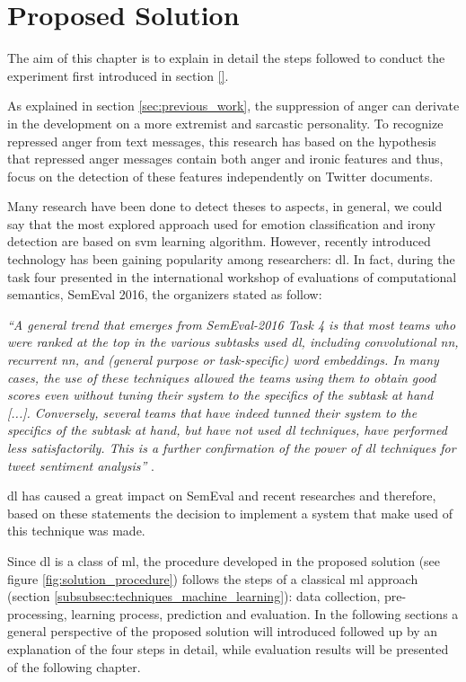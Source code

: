 \chapter{Proposed Solution}
\label{proposed_solution}

The aim of this chapter is to explain in detail the steps followed to conduct the experiment first introduced in section \ref{}.

As explained in section \ref{sec:previous_work}, the suppression of anger can derivate in the development on a more extremist and sarcastic personality. To recognize repressed anger from text messages, this research has based on the hypothesis that repressed anger messages contain both anger and ironic features and thus, focus on the detection of these features independently on Twitter documents.

Many research have been done to detect theses to aspects, in general, we could say that the most explored approach used for emotion classification and irony detection are based on \acrshort{svm} learning algorithm. However, recently introduced technology has been gaining popularity among researchers: \acrshort{dl}. In fact, during the task four presented in the international workshop of evaluations of computational semantics, SemEval 2016, the organizers stated as follow:

\textit{``A general trend that emerges from SemEval-2016 Task 4 is that most teams who were ranked at the top in the various subtasks used \acrlong{dl}, including convolutional \acrshort{nn}, recurrent \acrshort{nn}, and (general purpose or task-specific) word embeddings. In many cases, the use of these techniques allowed the teams using them to obtain good scores even without tuning their system to the specifics of the subtask at hand [...]. Conversely, several teams that have indeed tunned their system to the specifics of the subtask at hand, but have not used \acrlong{dl} techniques, have performed less satisfactorily. This is a further confirmation of the power of \acrlong{dl} techniques for tweet sentiment analysis''} \cite{nakov2016semeval}.

\acrshort{dl} has caused a great impact on SemEval and recent researches and therefore, based on these statements the decision to implement a system that make used of this technique was made.

Since \acrshort{dl} is a class of \acrshort{ml}, the procedure developed in the proposed solution (see figure \ref{fig:solution_procedure}) follows the steps of a classical \acrlong{ml} approach (section \ref{subsubsec:techniques_machine_learning}): data collection, pre-processing, learning process, prediction and evaluation. In the following sections a general perspective of the proposed solution will introduced followed up by an explanation of the four steps in detail, while evaluation results will be presented of the following chapter.

